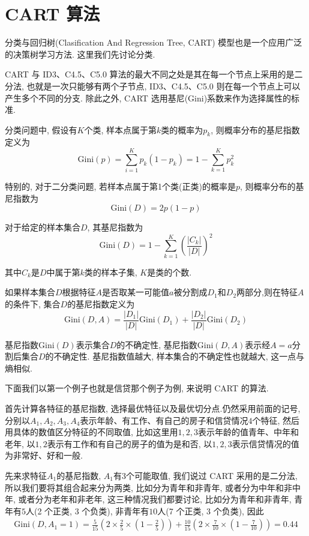 \documentclass[a4paper,UTF8]{ctexart}
\theoremstyle{plain} \newtheorem{theorem}{定理}[section]
\theoremstyle{plain} \newtheorem{definition}{定义}[section]
\theoremstyle{plain} \newtheorem{lemma}{引理}[section]
\theoremstyle{plain} \newtheorem{proposition}{命题}[section]
\theoremstyle{plain} \newtheorem{example}{例}
\theoremstyle{plain} \newtheorem{remark}{注}
\theoremstyle{plain} \newtheorem{corollary}{推论}[section]
\begin{document}
\section{CART 算法}
分类与回归树(Clasification And Regression Tree, CART) 模型也是一个应用广泛的决策树学习方法. 这里我们先讨论分类.

CART 与 ID3、C4.5、C5.0 算法的最大不同之处是其在每一个节点上采用的是二分法, 也就是一次只能够有两个子节点, ID3、C4.5、C5.0 则在每一个节点上可以产生多个不同的分支. 除此之外, CART 选用基尼(Gini)系数来作为选择属性的标准.

分类问题中, 假设有$K$个类, 样本点属于第$k$类的概率为$p_{k}$, 则概率分布的基尼指数定义为
\begin{equation*}
\mathrm{Gini}(p) = \sum_{i=1}^{K} p_{k} (1 - p_{k}) = 1 - \sum_{k=1}^{K} p_{k}^{2}
\end{equation*}

特别的, 对于二分类问题, 若样本点属于第1个类(正类)的概率是$p$, 则概率分布的基尼指数为
\begin{equation*}
\mathrm{Gini}(D) = 2p(1-p)
\end{equation*}

对于给定的样本集合$D$, 其基尼指数为
\begin{equation*}
\mathrm{Gini}(D) = 1 - \sum_{k=1}^{K} \left( \frac{|C_k|}{|D|} \right)^2
\end{equation*}

其中$C_k$是$D$中属于第$k$类的样本子集, $K$是类的个数.

如果样本集合$D$根据特征$A$是否取某一可能值$a$被分割成$D_{1}$和$D_{2}$两部分,则在特征$A$的条件下, 集合$D$的基尼指数定义为
\begin{equation*}
\mathrm{Gini}(D, A) = \frac{|D_1|}{|D|} \mathrm{Gini}(D_1) + \frac{|D_2|}{|D|} \mathrm{Gini}(D_2)
\end{equation*}

基尼指数$\mathrm{Gini}(D)$表示集合$D$的不确定性, 基尼指数$\mathrm{Gini}(D,A)$表示经$A = a$分割后集合$D$的不确定性. 基尼指数值越大, 样本集合的不确定性也就越大, 这一点与熵相似.

下面我们以第一个例子也就是信贷那个例子为例, 来说明 CART 的算法.

首先计算各特征的基尼指数, 选择最优特征以及最优切分点.仍然采用前面的记号, 分别以$A_1,A_2,A_3,A_4$表示年龄、有工作、有自己的房子和信贷情况$4$个特征, 然后用具体的数值区分特征的不同取值, 比如这里用$1,2,3$表示年龄的值青年、中年和老年, 以$1,2$表示有工作和有自己的房子的值为是和否, 以$1,2,3$表示信贷情况的值为非常好、好和一般.

先来求特征$A_{1}$的基尼指数, $A_1$有$3$个可能取值, 我们说过 CART 采用的是二分法, 所以我们要将其组合起来分为两类, 比如分为青年和非青年, 或者分为中年和非中年, 或者分为老年和非老年, 这三种情况我们都要讨论, 比如分为青年和非青年, 青年有$5$人(2 个正类, 3 个负类), 非青年有$10$人(7 个正类, 3 个负类), 因此
\begin{align*}
\mathrm{Gini}(D, A_{1} = 1) = \frac{5}{15} \left( 2 \times \frac{2}{5} \times \left( 1 - \frac{2}{5} \right) \right) + \frac{10}{15} \left( 2 \times \frac{7}{10} \times \left( 1 - \frac{7}{10} \right) \right) = 0.44
\end{align*}
\end{document}
